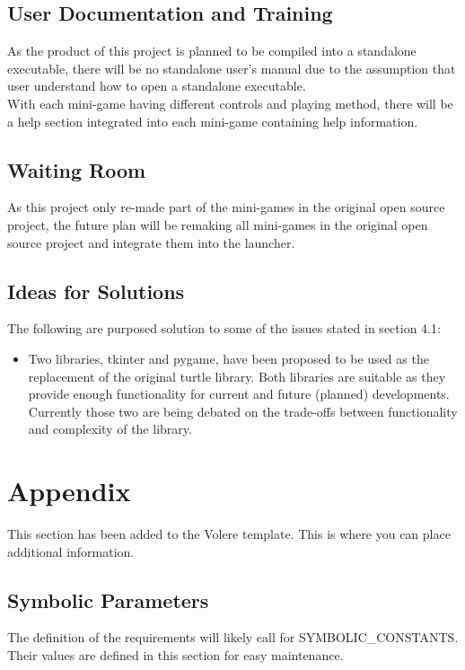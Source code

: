 \documentclass[12pt, titlepage]{article}
\begin{document}
\subsection{User Documentation and Training}

As the product of this project is planned to be compiled into a standalone executable, there will be no standalone user's manual due to the assumption that user understand how to open a standalone executable.\\
With each mini-game having different controls and playing method, there will be a help section integrated into each mini-game containing help information.

\subsection{Waiting Room}

As this project only re-made part of the mini-games in the original open source project, the future plan will be remaking all mini-games in the original open source project and integrate them into the launcher.

\subsection{Ideas for Solutions}

The following are purposed solution to some of the issues stated in section 4.1:
\begin{itemize}
    \item Two libraries, tkinter and pygame, have been proposed to be used as the replacement of the original turtle library. Both libraries are suitable as they provide enough functionality for current and future (planned) developments. Currently those two are being debated on the trade-offs between functionality and complexity of the library.
\end{itemize}





\newpage

\section{Appendix}

This section has been added to the Volere template.  This is where you can place
additional information.

\subsection{Symbolic Parameters}

The definition of the requirements will likely call for SYMBOLIC\_CONSTANTS.
Their values are defined in this section for easy maintenance.
\end{document}
